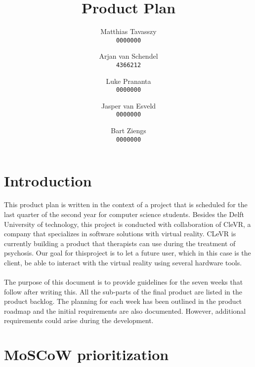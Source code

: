 \documentclass[11pt,a4paper]{report}
\title{Product Plan }
\author{
Matthias Tavasszy \\
\texttt{0000000}	
\and
Arjan van Schendel \\
\texttt{4366212}
\and
Luke Prananta \\ 
\texttt{0000000}  
\and
Jasper van Esveld \\
\texttt{0000000}
\and
Bart Ziengs \\ 
\texttt{0000000}
}
\begin{document}
\maketitle
\chapter*{Introduction}
This product plan is written in the context of a project that is scheduled for the last quarter of the second year for computer science students. Besides the Delft University of technology, this project is conducted with collaboration of CleVR, a company that specializes in software solutions with virtual reality. CLeVR is
currently building a product that therapists can use during the treatment of psychosis. Our goal for thisproject is to let a future user, which in this case is the client, be able to interact with the virtual reality
using several hardware tools. \\ \\
The purpose of this document is to provide guidelines for the seven weeks that follow after writing this.
All the sub-parts of the final product are listed in the product backlog. The planning for each week has
been outlined in the product roadmap and the initial requirements are also documented. However,
additional requirements could arise during the development.
\newpage
\tableofcontents
\chapter{MoSCoW prioritization}
\end{document}
